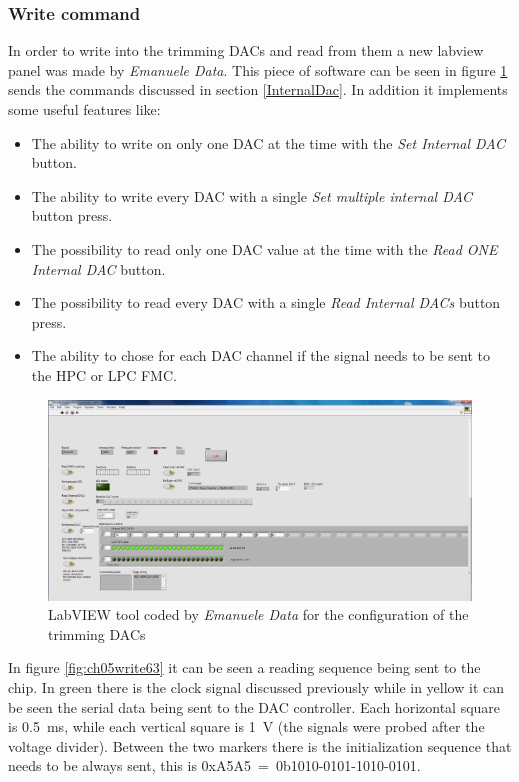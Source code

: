 \subsubsection{Write command}
\noindent In order to write into the trimming DACs and read from them a new labview panel was made by \textit{Emanuele Data}\cite{data}. This piece of software can be seen in figure \ref{fig:labview3} sends the commands discussed in section \ref{InternalDac}. In addition it implements some useful features like:
\begin{itemize}
	\item The ability to write on only one DAC at the time with the \textit{Set Internal DAC} button.
	\item The ability to write every DAC with a single \textit{Set multiple internal DAC} button press.
	\item The possibility to read only one DAC value at the time with the \textit{Read ONE Internal DAC} button.
	\item The possibility to read every DAC with a single \textit{Read Internal DACs} button press.
	\item The ability to chose for each DAC channel if the signal needs to be sent to the HPC or LPC FMC.
\end{itemize}
\begin{figure}[H]
	\centering
	\includegraphics[width=0.99\linewidth]{IMG/ch3/LABVIEW2}
	\caption{LabVIEW tool coded by \textit{Emanuele Data} for the configuration of the trimming DACs}
	\label{fig:labview3}
\end{figure}
\noindent In figure \ref{fig:ch05write63} it can be seen a reading sequence being sent to the chip. In green there is the clock signal discussed previously while in yellow it can be seen the serial data being sent to the DAC controller.
Each horizontal square is 0.5~ms, while each vertical square is 1~V (the signals were probed after the voltage divider). 
Between the two markers there is the initialization sequence that needs to be always sent, this is 0xA5A5~=~0b1010-0101-1010-0101.
